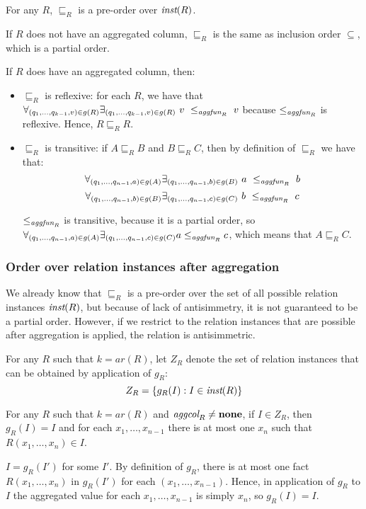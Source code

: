 \begin{lem}
For any $R$, $\sqsubseteq_R$ is a pre-order over $\textit{inst}(R)$.
\end{lem}\label{lem:preorder}

\begin{prof}

If $R$ does not have an aggregated column, $\sqsubseteq_R$ is the same as inclusion order $\subseteq$, which is a partial order.

If $R$ does have an aggregated column, then:

\begin{itemize}
\item $\sqsubseteq_R$ is reflexive: for each $R$, we have that  $\forall_{(q_1, ..., q_{k-1}, v) \in g(R)} \exists_{(q_1, ..., q_{k-1}, v) \in g(R)}~v~\le_{\textit{aggfun}_R}~v$ because $\le_{\textit{aggfun}_R}$ is reflexive. Hence, $R \sqsubseteq_R R$.
\item $\sqsubseteq_R$ is transitive: if $A \sqsubseteq_R B$ and $B \sqsubseteq_R  C$, then by definition of $\sqsubseteq_R$ we have that: $$\forall_{(q_1, ..., q_{n-1}, a) \in g(A)} \exists_{(q_1, ..., q_{n-1}, b) \in g(B)}~a~\le_{\textit{aggfun}_R}~b $$ $$\forall_{(q_1, ..., q_{n-1}, b) \in g(B)} \exists_{(q_1, ..., q_{n-1}, c) \in g(C)}~b~\le_{\textit{aggfun}_R}~c$$

$\le_{\textit{aggfun}_R}$ is transitive, because it is a partial order, so $\forall_{(q_1, ..., q_{n-1}, a) \in g(A)} \exists_{(q_1, ..., q_{n-1}, c) \in g(C)} a \le_{\textit{aggfun}_R} c $, which means that $A \sqsubseteq_R C$.
\end{itemize}

\end{prof}

\subsubsection{Order over relation instances after aggregation}

We already know that $\sqsubseteq_R$ is a pre-order over the set of all possible relation instances $\textit{inst}(R)$, but because of lack of antisimmetry, it is not guaranteed to be a partial order. However, if we restrict to the relation instances that are possible after aggregation is applied, the relation is antisimmetric.

For any $R$ such that $k=ar(R)$, let $Z_R$ denote the set of relation instances that can be obtained by application of $g_R$:
$$Z_R = \{g_R(I): I \in \textit{inst}(R)\}$$


\begin{lem}
For any $R$ such that $k=ar(R)$ and $\textit{aggcol}_R \ne {\bf none}$, if $I \in Z_R$, then $g_R(I) = I$ and for each $x_1, \dots, x_{n-1}$ there is at most one $x_n$ such that $R(x_1, \dots, x_n) \in I$.
\end{lem}\label{lem:fixgr}
\begin{prof}
$I = g_R(I')$ for some $I'$. By definition of $g_R$, there is at most one fact $R(x_1, \dots, x_n)$ in $g_R(I')$ for each $(x_1, \dots, x_{n-1})$. Hence, in application of $g_R$ to $I$ the aggregated value for each $x_1, \dots, x_{n-1}$ is simply $x_n$, so $g_R(I) = I$.
\end{prof}

